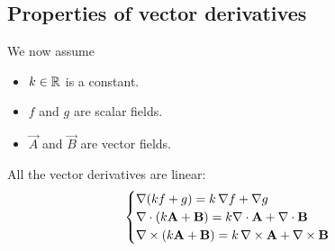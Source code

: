 \subsection{Properties of vector derivatives}
\begin{note}
We now assume
\begin{itemize}
\item $k\in \mathbb{R}$ is a constant.
\item $f$ and $g$ are scalar fields.
\item $\vec{A}$ and $\vec{B}$ are vector fields.
\end{itemize}
\end{note}
All the vector derivatives are linear:
\[ \begin{cases}
\mathop{}\! \nabla(kf+g) = k\mathop{}\! \nabla f + \mathop{}\! \nabla g \\
\nabla\cdot(k\boldsymbol{\mathrm{A}}+ \boldsymbol{\mathrm{B}}) = k\nabla\cdot\boldsymbol{\mathrm{A}} + \nabla\cdot \boldsymbol{\mathrm{B}} \\
\mathop{}\! \nabla\times(k \boldsymbol{\mathrm{A}}+ \boldsymbol{\mathrm{B}}) = k\mathop{}\! \nabla\times \boldsymbol{\mathrm{A}} + \mathop{}\! \nabla\times \boldsymbol{\mathrm{B}}
\end{cases} \]
